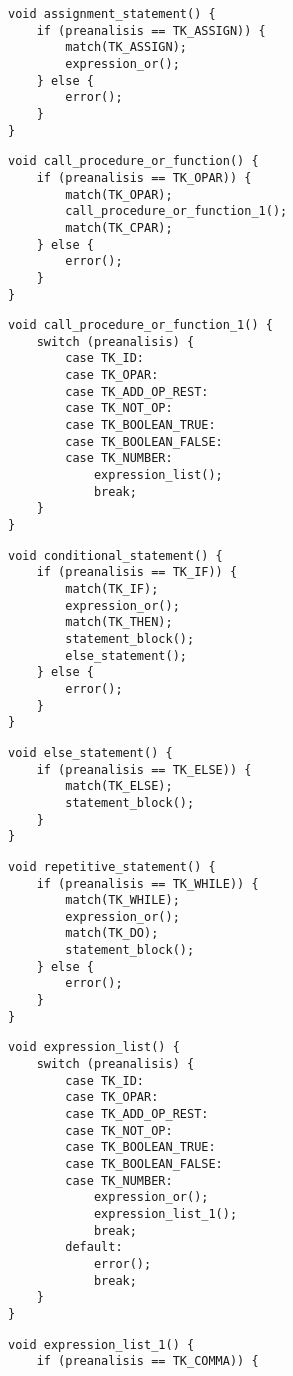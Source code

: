 \begin{multicols}{2}
\begin{verbatim}
void assignment_statement() {
	if (preanalisis == TK_ASSIGN)) {
		match(TK_ASSIGN);
		expression_or();
	} else {
		error();
	}
}
\end{verbatim}
\begin{verbatim}
void call_procedure_or_function() {
	if (preanalisis == TK_OPAR)) {
		match(TK_OPAR);
		call_procedure_or_function_1();
		match(TK_CPAR);
	} else {
		error();
	}
}
\end{verbatim}
\begin{verbatim}
void call_procedure_or_function_1() {
	switch (preanalisis) {
		case TK_ID:
		case TK_OPAR:
		case TK_ADD_OP_REST:
		case TK_NOT_OP:
		case TK_BOOLEAN_TRUE:
		case TK_BOOLEAN_FALSE:
		case TK_NUMBER:
			expression_list();
			break;
	}
}
\end{verbatim}
\begin{verbatim}
void conditional_statement() {
	if (preanalisis == TK_IF)) {
		match(TK_IF);
		expression_or();
		match(TK_THEN);
		statement_block();
		else_statement();
	} else {
		error();
	}
}
\end{verbatim}
\begin{verbatim}
void else_statement() {
	if (preanalisis == TK_ELSE)) {
		match(TK_ELSE);
		statement_block();
	}
}
\end{verbatim}
\begin{verbatim}
void repetitive_statement() {
	if (preanalisis == TK_WHILE)) {
		match(TK_WHILE);
		expression_or();
		match(TK_DO);
		statement_block();
	} else {
		error();
	}
}
\end{verbatim}
\begin{verbatim}
void expression_list() {
	switch (preanalisis) {
		case TK_ID:
		case TK_OPAR:
		case TK_ADD_OP_REST:
		case TK_NOT_OP:
		case TK_BOOLEAN_TRUE:
		case TK_BOOLEAN_FALSE:
		case TK_NUMBER:
			expression_or();
			expression_list_1();
			break;
		default:
			error();
			break;
	}
}
\end{verbatim}
\begin{verbatim}
void expression_list_1() {
	if (preanalisis == TK_COMMA)) {

\end{verbatim}
\end{multicols}
